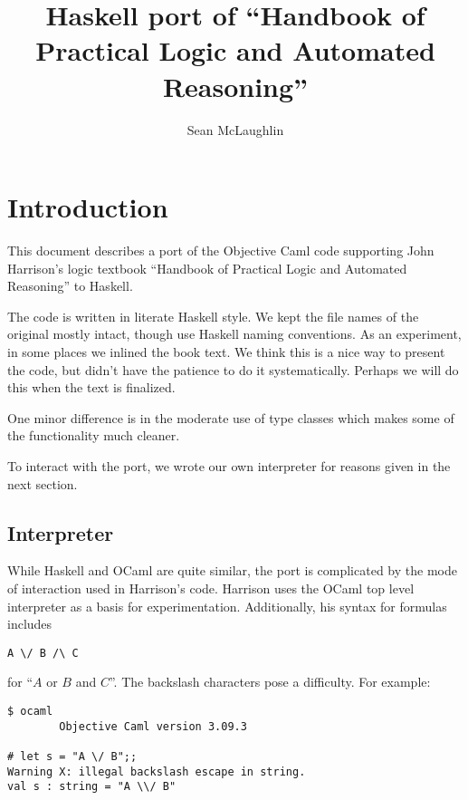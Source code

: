 \documentclass{article}
\begin{document}
 

\title{Haskell port of ``Handbook of Practical Logic and Automated Reasoning''} 
\author{Sean McLaughlin} 
\maketitle \pagestyle{plain} %

\section{Introduction}

This document describes a port of the Objective Caml code supporting
John Harrison's logic textbook ``Handbook of Practical Logic and
Automated Reasoning'' to Haskell. 

The code is written in literate Haskell style. We kept the file names
of the original mostly intact, though use Haskell naming conventions.
As an experiment, in some places we inlined the book text. We think
this is a nice way to present the code, but didn't have the patience
to do it systematically. Perhaps we will do this when the text is
finalized.

One minor difference is in the moderate use of type classes which
makes some of the functionality much cleaner. 

To interact with the port, we wrote our own interpreter for reasons
given in the next section.

\subsection{Interpreter}
While Haskell and OCaml are quite
similar, the port is complicated by the mode of interaction used in
Harrison's code. Harrison uses the OCaml top level interpreter
as a basis for experimentation. Additionally, his syntax for
formulas includes

\begin{verbatim}
A \/ B /\ C 
\end{verbatim}  

\noindent for ``$A$ or $B$ and $C$''. The backslash characters pose a
difficulty. For example:

\begin{verbatim} 
$ ocaml
        Objective Caml version 3.09.3

# let s = "A \/ B";;
Warning X: illegal backslash escape in string.
val s : string = "A \\/ B"
\end{verbatim} 
\end{document}
